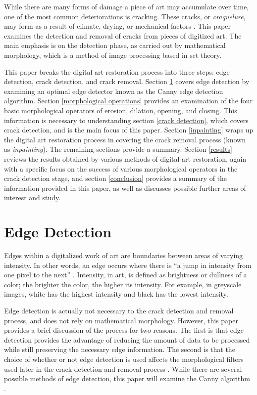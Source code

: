 \documentclass{sig-alternate}
\begin{document}
While there are many forms of damage a piece of art may accumulate over time, one of the most common deteriorations is cracking. These cracks, or \textit{craquelure}, may form as a result of climate, drying, or mechanical factors \cite{Altarpiece:2013, Statistics:2013, TopHat:2010}. This paper examines the detection and removal of cracks from pieces of digitized art. The main emphasis is on the detection phase, as carried out by mathematical morphology, which is a method of image processing based in set theory.

This paper breaks the digital art restoration process into three steps: edge detection, crack detection, and crack removal. Section \ref{edge detection} covers edge detection by examining an optimal edge detector known as the Canny edge detection algorithm. Section \ref{morphological operations} provides an examination of the four basic morphological operators of erosion, dilation, opening, and closing. This information is necessary to understanding section \ref{crack detection}, which covers crack detection, and is the main focus of this paper. Section \ref{inpainting} wraps up the digital art restoration process in covering the crack removal process (known as \textit{inpainting}). The remaining sections provide a summary. Section \ref{results} reviews the results obtained by various methods of digital art restoration, again with a specific focus on the success of various morphological operators in the crack detection stage, and section \ref{conclusion} provides a summary of the information provided in this paper, as well as discusses possible further areas of interest and study.

\section{Edge Detection}\label{edge detection}
Edges within a digitalized work of art are boundaries between areas of varying intensity. In other words, an edge occurs where there is ``a jump in intensity from one pixel to the next'' \cite{CannySummarized}. Intensity, in art, is defined as brightness or dullness of a color; the brighter the color, the higher its intensity. For example, in greyscale images, white has the highest intensity and black has the lowest intensity.

Edge detection is actually not necessary to the crack detection and removal process, and does not rely on mathematical morphology. However, this paper provides a brief discussion of the process for two reasons. The first is that edge detection provides the advantage of reducing the amount of data to be processed while still preserving the necessary edge information. The second is that the choice of whether or not edge detection is used affects the morphological filters used later in the crack detection and removal process \cite{CannySummarized}. While there are several possible methods of edge detection, this paper will examine the Canny algorithm \cite{Canny:1986, CannySummarized}.
\end{document}
